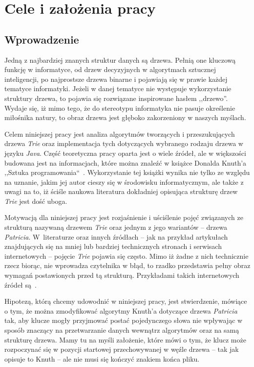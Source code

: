 
\chapter{Cele i założenia pracy}\label{cha:celeIZalozeniaPracy}
	\section{Wprowadzenie}\label{sec:celeIZalozeniaPracyWprowadzenie}
    Jedną z najbardziej znanych struktur danych są drzewa. Pełnią one kluczową funkcję w informatyce, od drzew decyzyjnych w algorytmach sztucznej inteligencji, po najprostsze drzewa binarne i pojawiają się w prawie każdej tematyce informatyki. Jeżeli w danej tematyce nie występuje wykorzystanie struktury drzewa, to pojawia się rozwiązane inspirowane hasłem ,,drzewo''. Wydaje się, iż mimo tego, że do stereotypu informatyka nie pasuje określenie miłośnika natury, to obraz drzewa jest głęboko zakorzeniony w naszych myślach.
	
	Celem niniejszej pracy jest analiza algorytmów tworzących i przeszukujących drzewa \emph{Trie} oraz implementacja tych dotyczących wybranego rodzaju drzewa w języku \emph{Java}. Część teoretyczna pracy oparta jest o wiele źródeł, ale w większości budowana jest na informacjach, które można znaleźć w książce Donalda Knuth'a ,,Sztuka programowania``~\cite{KnuthsTheArtOfComputerProgramming3}. Wykorzystanie tej książki wynika nie tylko ze względu na uznanie, jakim jej autor cieszy się w środowisku informatycznym, ale także z uwagi na to, iż ściśle naukowa literatura dokładniej opisująca strukturę drzew \emph{Trie} jest dość uboga.

	Motywacją dla niniejszej pracy jest rozjaśnienie i uściślenie pojęć związanych ze strukturą nazywaną drzewem \emph{Trie} oraz jednym z jego wariantów -- drzewa \emph{Patricia}. W~literaturze oraz innych źródłach -- jak na przykład artykułach znajdujących się na mniej lub bardziej technicznych stronach i serwisach internetowych -- pojęcie \emph{Trie} pojawia się często. Mimo iż żadne z nich technicznie rzecz biorąc, nie wprowadza czytelnika w błąd, to rzadko przedstawia pełny obraz wymagań postawionych przed tą strukturą. Przykładami takich internetowych źródeł są~\cite{GFGTrieInserAndSearch,GFGAdvantagesOfTrieDataStructure,BaeldungComTrieJava,MediumComHowToBuildATrieTree,MediumComTryingToUnderstandTries}.
	
    Hipotezą, którą chcemy udowodnić w niniejszej pracy, jest stwierdzenie, mówiące o tym, że można zmodyfikować algorytmy Knuth'a dotyczące drzewa \emph{Patricia} tak, aby klucze mogły przyjmować postać pojedynczego słowa nie wpływając w sposób znaczący na przetwarzanie danych wewnątrz algorytmów oraz na samą strukturę drzewa. Mamy tu na myśli założenie, które mówi o tym, że klucz może rozpoczynać się w pozycji startowej przechowywanej w węźle drzewa -- tak jak opisuje to Knuth -- ale nie musi się kończyć znakiem końca pliku.
	
